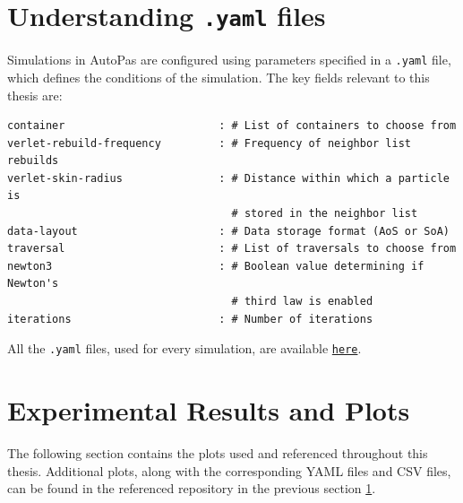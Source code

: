\section{Understanding \texttt{.yaml} files} \label{app:yaml}
Simulations in AutoPas are configured using parameters specified in a \texttt{.yaml} file, which defines the conditions of the simulation. The key fields relevant to this thesis are:

\begin{verbatim}
container                        : # List of containers to choose from
verlet-rebuild-frequency         : # Frequency of neighbor list rebuilds
verlet-skin-radius               : # Distance within which a particle is 
                                   # stored in the neighbor list
data-layout                      : # Data storage format (AoS or SoA)
traversal                        : # List of traversals to choose from
newton3                          : # Boolean value determining if Newton's 
                                   # third law is enabled
iterations                       : # Number of iterations
\end{verbatim}

All the \texttt{.yaml} files, used for every simulation, are available \href{https://github.com/xhulia028/GraphView}{\texttt{here}}.

\section{Experimental Results and Plots}

The following section contains the plots used and referenced throughout this thesis. Additional plots, along with the corresponding YAML files and CSV files, can be found in the referenced repository in the previous section \ref{app:yaml}.


